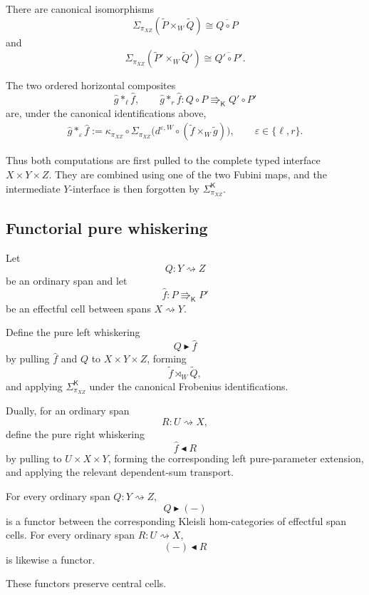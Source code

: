 There are canonical isomorphisms
\[
    \Sigma_{\pi_{XZ}}
    (\widetilde P\times_W\widetilde Q)
    \cong
    \overline{Q\circ P}
\]
and
\[
    \Sigma_{\pi_{XZ}}
    (\widetilde P'\times_W\widetilde Q')
    \cong
    \overline{Q'\circ P'}.
\]

\begin{definition}
\label{def:ordered-horizontal-effectful-composites}
The two ordered horizontal composites
\[
    \widehat g\ast_\ell\widehat f,
    \qquad
    \widehat g\ast_r\widehat f:
    Q\circ P
    \Rrightarrow_{\mathsf K}
    Q'\circ P'
\]
are, under the canonical identifications above,
\[
\begin{aligned}
    \widehat g\ast_\varepsilon\widehat f
    :=
    \kappa_{\pi_{XZ}}
    \circ
    \Sigma_{\pi_{XZ}}
    \bigl(
        d^{\varepsilon,W}
        \circ
        (\widetilde f\times_W\widetilde g)
    \bigr),
    \qquad
    \varepsilon\in\{\ell,r\}.
\end{aligned}
\]
\end{definition}

Thus both computations are first pulled to the complete typed interface
\(X\times Y\times Z\).  They are combined using one of the two Fubini maps,
and the intermediate \(Y\)-interface is then forgotten by
\(\Sigma_{\pi_{XZ}}^{\mathsf K}\).

\subsection{Functorial pure whiskering}
\label{subsec:functorial-pure-whiskering}

Let
\[
    Q:Y\rightsquigarrow Z
\]
be an ordinary span and let
\[
    \widehat f:
    P\Rrightarrow_{\mathsf K}P'
\]
be an effectful cell between spans \(X\rightsquigarrow Y\).

Define the pure left whiskering
\[
    Q\blacktriangleright\widehat f
\]
by pulling \(\widehat f\) and \(Q\) to \(X\times Y\times Z\), forming
\[
    \widetilde f\rtimes_W\widetilde Q,
\]
and applying
\(\Sigma_{\pi_{XZ}}^{\mathsf K}\) under the canonical Frobenius
identifications.

Dually, for an ordinary span
\[
    R:U\rightsquigarrow X,
\]
define the pure right whiskering
\[
    \widehat f\blacktriangleleft R
\]
by pulling to \(U\times X\times Y\), forming the corresponding left
pure-parameter extension, and applying the relevant dependent-sum transport.

\begin{proposition}
\label{prop:functorial-pure-span-whiskering}
For every ordinary span \(Q:Y\rightsquigarrow Z\),
\[
    Q\blacktriangleright(-)
\]
is a functor between the corresponding Kleisli hom-categories of effectful
span cells.  For every ordinary span \(R:U\rightsquigarrow X\),
\[
    (-)\blacktriangleleft R
\]
is likewise a functor.

These functors preserve central cells.
\end{proposition}

